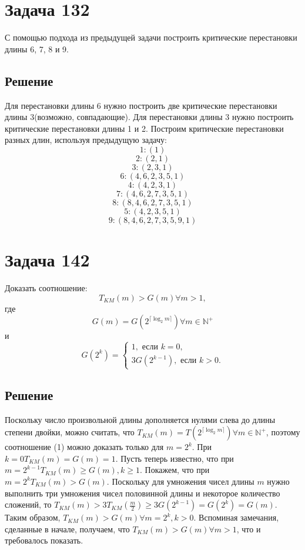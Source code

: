 \documentclass[11pt]{article}
\newcounter{th}\setcounter{th}{0}
\begin{document}
\section{Задача 132}
\label{sec:org539b773}
С помощью подхода из предыдущей задачи построить критические перестановки длины 6, 7, 8 и 9.
\subsection{Решение}
\label{sec:org060f733}
Для перестановки длины 6 нужно построить две критические перестановки длины 3(возможно,
совпадающие). Для перестановки длины 3 нужно построить критические перестановки длины 1 и 2.
Построим критические перестановки разных длин, используя предыдущую задачу:
$$1: (1)$$
$$2: (2, 1)$$
$$3: (2, 3, 1)$$
$$6: (4, 6, 2, 3, 5, 1)$$
$$4: (4, 2, 3, 1)$$
$$7: (4, 6, 2, 7, 3, 5, 1)$$
$$8: (8, 4, 6, 2, 7, 3, 5, 1)$$
$$5: (4, 2, 3, 5, 1)$$
$$9: (8, 4, 6, 2, 7, 3, 5, 9, 1)$$
\section{Задача 142}
\label{sec:orgb99ce31}
Доказать соотношение:
\begin{equation}
T_{KM}(m) > G(m) \forall m > 1,
\end{equation}
где
\begin{equation*}
G(m) = G(2^{\lceil\log_2m\rceil}) \forall m \in \mathbb{N}^+
\end{equation*}
и
\begin{equation*}
G(2^k) = \begin{cases}
1, \text{ если } k = 0, \\
3G(2^{k - 1}), \text{ если } k > 0.
\end{cases}
\end{equation*}
\subsection{Решение}
\label{sec:orgb40fecd}
Поскольку число произвольной длины дополняется нулями слева до длины степени двойки, можно
считать, что \(T_{KM}(m) = T(2^{\lceil\log_2m\rceil}) \forall m \in \mathbb{N}^+\), поэтому
соотношение (1) можно доказать только для \(m = 2^k\). При \(k = 0 T_{KM}(m) = G(m) = 1\). Пусть
теперь известно, что при \(m = 2^{k - 1} T_{KM}(m) \geq G(m), k \geq 1\). Покажем, что при \(m = 2^k T_{KM}(m) > G(m)\).
Поскольку для умножения чисел длины \(m\) нужно выполнить три умножения чисел половинной длины и
некоторое количество сложений, то \(T_{KM}(m) > 3T_{KM}\left(\frac{m}2\right) \geq 3G(2^{k - 1}) = G(2^k) = G(m)\).
Таким образом, \(T_{KM}(m) > G(m) \forall m = 2^k, k > 0\). Вспоминая замечания, сделанные в
начале, получаем, что \(T_{KM}(m) > G(m) \forall m > 1\), что и требовалось показать.
\end{document}
